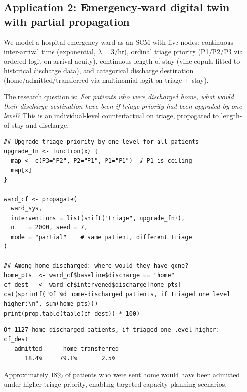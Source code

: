 \documentclass[12pt,a4paper]{article}
\begin{document}
\subsection{Application 2: Emergency-ward digital twin with partial propagation}
\label{sec:app_ward}

We model a hospital emergency ward as an SCM with five nodes: continuous
inter-arrival time (exponential, $\lambda = 3/\text{hr}$), ordinal triage
priority (P1/P2/P3 via ordered logit on arrival acuity), continuous length of
stay (vine copula fitted to historical discharge data), and categorical discharge
destination (home/admitted/transferred via multinomial logit on triage + stay).

The research question is: \emph{For patients who were discharged home, what would
their discharge destination have been if triage priority had been upgraded by one
level?} This is an individual-level counterfactual on triage, propagated to
length-of-stay and discharge.

\begin{tcolorbox}[codebox, title={\small\textbf{R} code --- triage counterfactual}]
\begin{verbatim}
## Upgrade triage priority by one level for all patients
upgrade_fn <- function(x) {
  map <- c(P3="P2", P2="P1", P1="P1")  # P1 is ceiling
  map[x]
}

ward_cf <- propagate(
  ward_sys,
  interventions = list(shift("triage", upgrade_fn)),
  n    = 2000, seed = 7,
  mode = "partial"    # same patient, different triage
)

## Among home-discharged: where would they have gone?
home_pts  <- ward_cf$baseline$discharge == "home"
cf_dest   <- ward_cf$intervened$discharge[home_pts]
cat(sprintf("Of %d home-discharged patients, if triaged one level higher:\n", sum(home_pts)))
print(prop.table(table(cf_dest)) * 100)
\end{verbatim}
\end{tcolorbox}

\begin{tcolorbox}[outputbox, title={\small Output}]
\begin{verbatim}
Of 1127 home-discharged patients, if triaged one level higher:
cf_dest
   admitted      home transferred
      18.4%     79.1%       2.5%
\end{verbatim}
\end{tcolorbox}

Approximately 18\% of patients who were sent home would have been admitted under
higher triage priority, enabling targeted capacity-planning scenarios.
\end{document}
